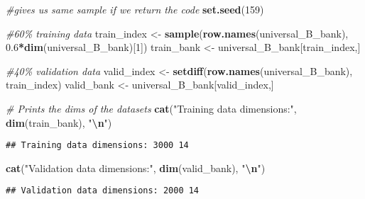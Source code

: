 \documentclass[
]{article}
\newenvironment{Shaded}{\begin{snugshade}}{\end{snugshade}}
\newcommand{\CommentTok}[1]{\textcolor[rgb]{0.56,0.35,0.01}{\textit{#1}}}
\newcommand{\DecValTok}[1]{\textcolor[rgb]{0.00,0.00,0.81}{#1}}
\newcommand{\FloatTok}[1]{\textcolor[rgb]{0.00,0.00,0.81}{#1}}
\newcommand{\FunctionTok}[1]{\textcolor[rgb]{0.13,0.29,0.53}{\textbf{#1}}}
\newcommand{\NormalTok}[1]{#1}
\newcommand{\OtherTok}[1]{\textcolor[rgb]{0.56,0.35,0.01}{#1}}
\newcommand{\SpecialCharTok}[1]{\textcolor[rgb]{0.81,0.36,0.00}{\textbf{#1}}}
\newcommand{\StringTok}[1]{\textcolor[rgb]{0.31,0.60,0.02}{#1}}
\begin{document}
\begin{Shaded}
\begin{Highlighting}[]
\CommentTok{\#gives us same sample if we return the code}
\FunctionTok{set.seed}\NormalTok{(}\DecValTok{159}\NormalTok{) }

\CommentTok{\#60\% training data}
\NormalTok{train\_index }\OtherTok{\textless{}{-}} \FunctionTok{sample}\NormalTok{(}\FunctionTok{row.names}\NormalTok{(universal\_B\_bank), }\FloatTok{0.6}\SpecialCharTok{*}\FunctionTok{dim}\NormalTok{(universal\_B\_bank)[}\DecValTok{1}\NormalTok{])}
\NormalTok{train\_bank }\OtherTok{\textless{}{-}}\NormalTok{ universal\_B\_bank[train\_index,]}

\CommentTok{\#40\% validation data}
\NormalTok{valid\_index }\OtherTok{\textless{}{-}} \FunctionTok{setdiff}\NormalTok{(}\FunctionTok{row.names}\NormalTok{(universal\_B\_bank), train\_index)}
\NormalTok{valid\_bank }\OtherTok{\textless{}{-}}\NormalTok{ universal\_B\_bank[valid\_index,]}

\CommentTok{\# Prints the dims of the datasets}
\FunctionTok{cat}\NormalTok{(}\StringTok{"Training data dimensions:"}\NormalTok{, }\FunctionTok{dim}\NormalTok{(train\_bank), }\StringTok{"}\SpecialCharTok{\textbackslash{}n}\StringTok{"}\NormalTok{)}
\end{Highlighting}
\end{Shaded}

\begin{verbatim}
## Training data dimensions: 3000 14
\end{verbatim}

\begin{Shaded}
\begin{Highlighting}[]
\FunctionTok{cat}\NormalTok{(}\StringTok{"Validation data dimensions:"}\NormalTok{, }\FunctionTok{dim}\NormalTok{(valid\_bank), }\StringTok{"}\SpecialCharTok{\textbackslash{}n}\StringTok{"}\NormalTok{)}
\end{Highlighting}
\end{Shaded}

\begin{verbatim}
## Validation data dimensions: 2000 14
\end{verbatim}
\end{document}
